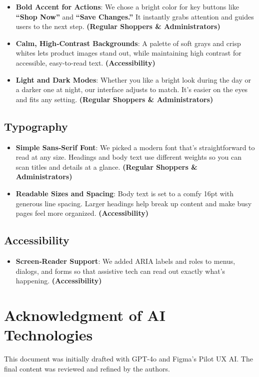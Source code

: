 \documentclass[12pt]{article}
\begin{document}
	\begin{itemize}
	\item \textbf{Bold Accent for Actions}: We chose a bright color for key buttons like \textbf{“Shop Now”} and \textbf{“Save Changes.”} It instantly grabs attention and guides users to the next step. \textbf{(Regular Shoppers \& Administrators)}
	\item \textbf{Calm, High‑Contrast Backgrounds}: A palette of soft grays and crisp whites lets product images stand out, while maintaining high contrast for accessible, easy-to-read text. \textbf{(Accessibility)}
	\item \textbf{Light and Dark Modes}: Whether you like a bright look during the day or a darker one at night, our interface adjusts to match. It’s easier on the eyes and fits any setting. \textbf{(Regular Shoppers \& Administrators)}
	\end{itemize}

	\subsection{Typography}\label{subsec:typography}

	\begin{itemize}
	\item \textbf{Simple Sans‑Serif Font}: We picked a modern font that’s straightforward to read at any size. Headings and body text use different weights so you can scan titles and details at a glance. \textbf{(Regular Shoppers \& Administrators)}
	\item \textbf{Readable Sizes and Spacing}: Body text is set to a comfy 16pt with generous line spacing. Larger headings help break up content and make busy pages feel more organized. \textbf{(Accessibility)}
	\end{itemize}

	\subsection{Accessibility}\label{subsec:accessibility}

	\begin{itemize}
	\item \textbf{Screen‑Reader Support}: We added ARIA labels and roles to menus, dialogs, and forms so that assistive tech can read out exactly what’s happening. \textbf{(Accessibility)}
	\end{itemize}

	\section{Acknowledgment of AI Technologies}\label{sec:acknowledgment-of-ai-technologies}

	This document was initially drafted with GPT-4o and Figma's Pilot UX AI. The final content was reviewed and refined by the authors.
\end{document}
